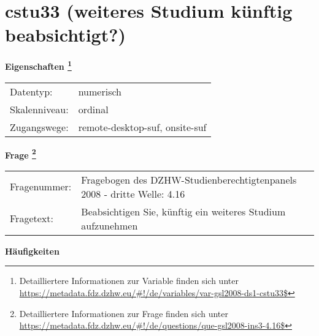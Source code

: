 
    \setcounter{footnote}{0}

    \vspace*{-1.8cm}
	\section{cstu33 (weiteres Studium künftig beabsichtigt?)}
	\label{section:cstu33}



    \vspace*{0.5cm}
    \noindent\textbf{Eigenschaften
	\footnote{Detailliertere Informationen zur Variable finden sich unter
		\url{https://metadata.fdz.dzhw.eu/\#!/de/variables/var-gsl2008-ds1-cstu33$}}}\\
	\begin{tabularx}{\hsize}{@{}lX}
	Datentyp: & numerisch \\
	Skalenniveau: & ordinal \\
	Zugangswege: &
	  remote-desktop-suf, 
	  onsite-suf
 \\
    \end{tabularx}



				\vspace*{0.5cm}
                \noindent\textbf{Frage
	                \footnote{Detailliertere Informationen zur Frage finden sich unter
		              \url{https://metadata.fdz.dzhw.eu/\#!/de/questions/que-gsl2008-ins3-4.16$}}}\\
				\begin{tabularx}{\hsize}{@{}lX}
					Fragenummer: &
					  Fragebogen des DZHW-Studienberechtigtenpanels 2008 - dritte Welle:
					  4.16
 \\
					Fragetext: & Beabsichtigen Sie, künftig ein weiteres Studium aufzunehmen \\
				\end{tabularx}





        		\vspace*{0.5cm}
                \noindent\textbf{Häufigkeiten}

